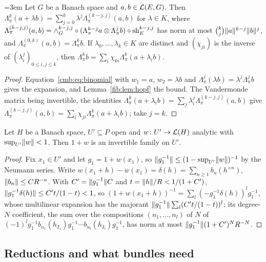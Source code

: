 \begin{lemma}\label{fmo:lem:vandermonde}\emergencystretch=3em
Let $G$ be a Banach space and $a,b\in\mathcal L(E,G)$. Then $\Lambda^k_\pi(a+\lambda b)=\sum_{j=0}^k\lambda^j\Lambda^{(k-j,j)}_\pi
(a,b)$ for $\lambda\in K$, where $\Lambda^{(k-j,j)}_\pi(a,b)=\wedge^{k-j,j}_G\circ(\Lambda^{k-j}_\pi a\otimes\Lambda^j_\pi b)
\circ\operatorname{sh}^{k-j,j}_E$ has norm at most $\binom kj\lVert a\rVert^{k-j}\lVert b\rVert^j$, and $\Lambda^{(0,k)}_\pi(a,b)=\Lambda^k_\pi b$. If
$\lambda_0,\dots,\lambda_k\in K$ are distinct and $(\chi_{ji})$ is the inverse of $(\lambda_i^j)_{0\le i,j\le k}$, then
$\Lambda^k_\pi b=\sum_i\chi_{ki}\Lambda^k_\pi(a+\lambda_ib)$.
\end{lemma}

\begin{proof}
Equation~\eqref{cmb:eq:binomial} with $w_1=a$, $w_2=\lambda b$ and $\Lambda^j_\pi(\lambda b)=\lambda^j\Lambda^j_\pi b$ gives
the expansion, and Lemma~\ref{fib:lem:hopf} the bound. The Vandermonde matrix being invertible, the identities
$\Lambda^k_\pi(a+\lambda_ib)=\sum_j\lambda_i^j\Lambda^{(k-j,j)}_\pi(a,b)$ give $\Lambda^{(k-j,j)}_\pi(a,b)=
\sum_i\chi_{ji}\Lambda^k_\pi(a+\lambda_ib)$; take $j=k$.
\end{proof}

\begin{lemma}\label{fmo:lem:neumann}
Let $H$ be a Banach space, $U'\subseteq P$ open and $w\colon U'\to\mathcal L(H)$ analytic with $\sup_{U'}\lVert w\rVert<1$. Then $1+w$ is
an invertible family on $U'$.
\end{lemma}

\begin{proof}
Fix $x_1\in U'$ and let $g_1=1+w(x_1)$, so $\lVert g_1^{-1}\rVert\le(1-\sup_{U'}\lVert w\rVert)^{-1}$ by the Neumann series. Write
$w(x_1+h)-w(x_1)=\delta(h)=\sum_{n\ge1}b_n(h^{\times n})$, $\lVert b_n\rVert\le CR^{-n}$. With $C'=\lVert g_1^{-1}\rVert C$ and
$t=\lVert h\rVert/R<1/(1+C')$, $\lVert g_1^{-1}\delta(h)\rVert\le C't/(1-t)<1$, so $(1+w(x_1+h))^{-1}=\sum_l(-g_1^{-1}\delta(h))^l
g_1^{-1}$, whose multilinear expansion has the majorant $\lVert g_1^{-1}\rVert\sum_l(C't/(1-t))^l$; its degree-$N$
coefficient, the sum over the compositions $(n_1,\dots,n_l)$ of $N$ of
$(-1)^lg_1^{-1}b_{n_1}(h_{I_1})g_1^{-1}\cdots b_{n_l}(h_{I_l})g_1^{-1}$, has norm at most $\lVert g_1^{-1}\rVert(1+C')^NR^{-N}$.
\end{proof}

\subsection{Reductions and what bundles need}\label{fmo:ssec:reductions}

